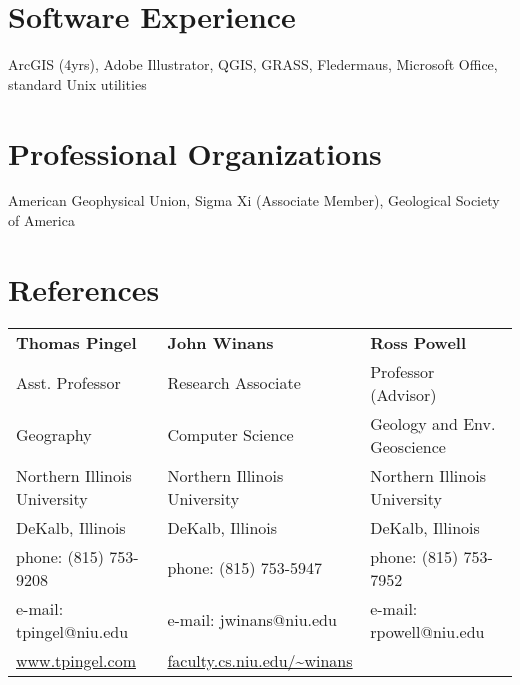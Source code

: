 \documentclass{cv_TOH}
\begin{document}
\section{Software Experience}
ArcGIS (4yrs), Adobe Illustrator, QGIS, GRASS, Fledermaus, Microsoft Office, standard Unix utilities

\section{Professional Organizations}
American Geophysical Union, Sigma Xi (Associate Member), Geological Society of America

\section{References}
\begin{tabular}{@{}p{6cm}p{6cm}p{6cm}}
 \textbf{Thomas Pingel}            & \textbf{John Winans}              &   \textbf{Ross Powell}           \\
 Asst. Professor                   &  Research Associate               &   Professor (Advisor)            \\ 
 Geography                         &  Computer Science                 &   Geology and Env. Geoscience    \\
 Northern Illinois University      &  Northern Illinois University     &   Northern Illinois University   \\ 
 DeKalb, Illinois                  &  DeKalb, Illinois                 &   DeKalb, Illinois               \\
 phone: (815) 753-9208             &  phone: (815) 753-5947            &   phone: (815) 753-7952          \\
 e-mail: tpingel@niu.edu           &  e-mail: jwinans@niu.edu          &   e-mail: rpowell@niu.edu        \\
 \url{www.tpingel.com}             &  \url{faculty.cs.niu.edu/~winans} &                                  \\     
\end{tabular}
\end{document}
